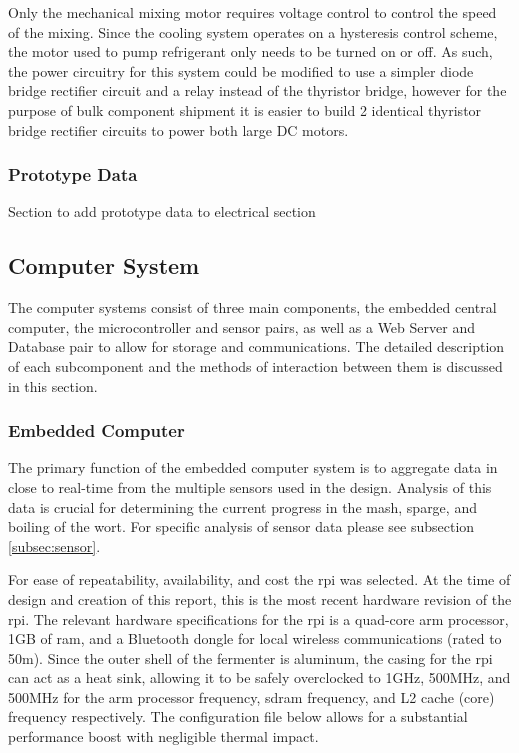 \documentclass{article}
\begin{document}
Only the mechanical mixing motor requires voltage control to control the speed of the mixing. Since the cooling system operates on a hysteresis control scheme, the motor used to pump refrigerant only needs to be turned on or off. As such, the power circuitry for this system could be modified to use a simpler diode bridge rectifier circuit and a relay instead of the thyristor bridge, however for the purpose of bulk component shipment it is easier to build 2 identical thyristor bridge rectifier circuits to power both large DC motors.

\subsubsection{Prototype Data}
Section to add prototype data to electrical section

\subsection{Computer System}
The computer systems consist of three main components, the embedded central computer, the microcontroller and sensor pairs, as well as a Web Server and Database pair to allow for storage and communications.  The detailed description of each subcomponent and the methods of interaction between them is discussed in this section.
\subsubsection{Embedded Computer}
The primary function of the embedded computer system is to aggregate data in close to real-time from the multiple sensors used in the design.  Analysis of this data is crucial for determining the current progress in the \gls{mash}, \gls{sparge}, and boiling of the \gls{wort}.  For specific analysis of sensor data please see subsection \ref{subsec:sensor}.

For ease of repeatability, availability, and cost the \gls{rpi} was selected.  At the time of design and creation of this report, this is the most recent hardware revision of the \gls{rpi}.  The relevant hardware specifications for the \gls{rpi} is a quad-core \gls{arm} processor, 1GB of \gls{ram}, and a Bluetooth dongle for local wireless communications (rated to 50m).  Since the outer shell of the fermenter is aluminum, the casing for the \gls{rpi} can act as a heat sink, allowing it to be safely overclocked to 1GHz, 500MHz, and 500MHz for the \gls{arm} processor frequency, sdram frequency, and L2 cache (core) frequency respectively.  The configuration file below allows for a substantial performance boost with negligible thermal impact.  
\end{document}
